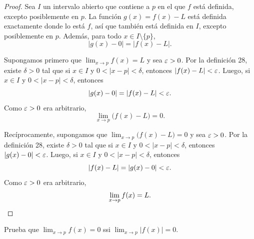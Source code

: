 \documentclass[12pt,a4paper]{article}
\begin{document}
    \begin{proof}
        Sea $I$ un intervalo abierto que contiene a $p$ en el que $f$ está definida, excepto posiblemente en $p$. La función $g(x)=f(x)-L$ está definida exactamente donde lo está $f$, así que también está definida en $I$, excepto posiblemente en $p$. Además, para todo $x\in I\setminus\{p\}$,
        \begin{equation*}
            |g(x)-0|=|f(x)-L|.
        \end{equation*}

        Supongamos primero que $\lim_{x\to p}f(x)=L$ y sea $\varepsilon>0$. Por la definición 28, existe $\delta>0$ tal que si $x\in I$ y $0<|x-p|<\delta$, entonces $|f(x)-L|<\varepsilon$. Luego, si $x\in I$ y $0<|x-p|<\delta$, entonces
        \begin{equation*}
            |g(x)-0|=|f(x)-L|<\varepsilon.
        \end{equation*}
        Como $\varepsilon>0$ era arbitrario,
        \begin{equation*}
            \lim_{x\to p}\bigl(f(x)-L\bigr)=0.
        \end{equation*}

        Recíprocamente, supongamos que $\lim_{x\to p}\bigl(f(x)-L\bigr)=0$ y sea $\varepsilon>0$. Por la definición 28, existe $\delta>0$ tal que si $x\in I$ y $0<|x-p|<\delta$, entonces $|g(x)-0|<\varepsilon$. Luego, si $x\in I$ y $0<|x-p|<\delta$, entonces
        \begin{equation*}
            |f(x)-L|=|g(x)-0|<\varepsilon.
        \end{equation*}
        Como $\varepsilon>0$ era arbitrario,
        \begin{equation*}
            \lim_{x\to p}f(x)=L.\qedhere
        \end{equation*}
    \end{proof}

    \begin{problema}
        Prueba que $\displaystyle\lim_{x\to p}f(x)=0$ ssi $\displaystyle\lim_{x\to p}|f(x)|=0$.
    \end{problema}
\end{document}
